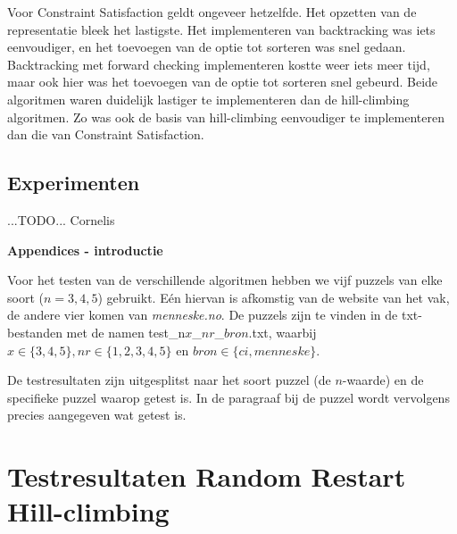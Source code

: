 \documentclass[]{report}
\begin{document}
Voor Constraint Satisfaction geldt ongeveer hetzelfde. Het opzetten van de representatie bleek het lastigste. Het implementeren van backtracking was iets eenvoudiger, en het toevoegen van de optie tot sorteren was snel gedaan. Backtracking met forward checking implementeren kostte weer iets meer tijd, maar ook hier was het toevoegen van de optie tot sorteren snel gebeurd. Beide algoritmen waren duidelijk lastiger te implementeren dan de hill-climbing algoritmen. Zo was ook de basis van hill-climbing eenvoudiger te implementeren dan die van Constraint Satisfaction.

\section{Experimenten}
...TODO... Cornelis

\begin{appendices}
{\Huge \textbf{Appendices - introductie}}\newline

Voor het testen van de verschillende algoritmen hebben we vijf puzzels van elke soort ($n = 3, 4, 5$) gebruikt. Eén hiervan is afkomstig van de website van het vak, de andere vier komen van \textit{menneske.no}. De puzzels zijn te vinden in de txt-bestanden met de namen test\_n$x$\_$nr$\_$bron$.txt, waarbij $x \in \{3,4,5\}, nr \in \{1,2,3,4,5\}$ en $bron \in \{ci,menneske\}$.

De testresultaten zijn uitgesplitst naar het soort puzzel (de $n$-waarde) en de specifieke puzzel waarop getest is. In de paragraaf bij de puzzel wordt vervolgens precies aangegeven wat getest is.

\chapter{Testresultaten Random Restart Hill-climbing}

\end{appendices}
\end{document}
